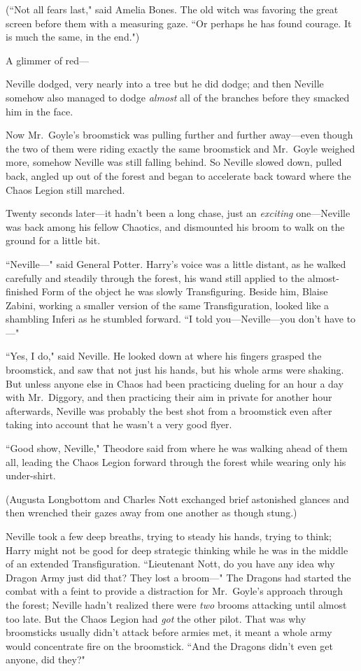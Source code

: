 (``Not all fears last," said Amelia Bones. The old witch was favoring the great screen before them with a measuring gaze. ``Or perhaps he has found courage. It is much the same, in the end.")

A glimmer of red—

Neville dodged, very nearly into a tree but he did dodge; and then Neville somehow also managed to dodge \emph{almost} all of the branches before they smacked him in the face.

Now Mr.~Goyle's broomstick was pulling further and further away—even though the two of them were riding exactly the same broomstick and Mr.~Goyle weighed more, somehow Neville was still falling behind. So Neville slowed down, pulled back, angled up out of the forest and began to accelerate back toward where the Chaos Legion still marched.

Twenty seconds later—it hadn't been a long chase, just an \emph{exciting} one—Neville was back among his fellow Chaotics, and dismounted his broom to walk on the ground for a little bit.

``Neville—" said General Potter. Harry's voice was a little distant, as he walked carefully and steadily through the forest, his wand still applied to the almost-finished Form of the object he was slowly Transfiguring. Beside him, Blaise Zabini, working a smaller version of the same Transfiguration, looked like a shambling Inferi as he stumbled forward. ``I told you—Neville—you don't have to—"

``Yes, I do," said Neville. He looked down at where his fingers grasped the broomstick, and saw that not just his hands, but his whole arms were shaking. But unless anyone else in Chaos had been practicing dueling for an hour a day with Mr.~Diggory, and then practicing their aim in private for another hour afterwards, Neville was probably the best shot from a broomstick even after taking into account that he wasn't a very good flyer.

``Good show, Neville," Theodore said from where he was walking ahead of them all, leading the Chaos Legion forward through the forest while wearing only his under-shirt.

(Augusta Longbottom and Charles Nott exchanged brief astonished glances and then wrenched their gazes away from one another as though stung.)

Neville took a few deep breaths, trying to steady his hands, trying to think; Harry might not be good for deep strategic thinking while he was in the middle of an extended Transfiguration. ``Lieutenant Nott, do you have any idea why Dragon Army just did that? They lost a broom—" The Dragons had started the combat with a feint to provide a distraction for Mr.~Goyle's approach through the forest; Neville hadn't realized there were \emph{two} brooms attacking until almost too late. But the Chaos Legion had \emph{got} the other pilot. That was why broomsticks usually didn't attack before armies met, it meant a whole army would concentrate fire on the broomstick. ``And the Dragons didn't even get anyone, did they?"

